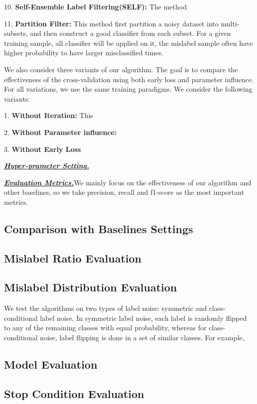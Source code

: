 10. \textbf{Self-Ensemble Label Filtering(SELF):} The method 

11. \textbf{Partition Filter:} This method first partition a noisy dataset into multi-subsets, and then construct a good classifier from each subset. For a given training sample, all classifier will be applied on it, the mislabel sample often have higher probability to have larger misclassified times.

We also consider three variants of our algorithm. The goal is to compare the effectiveness of the cross-validation using both early loss and parameter influence. For all variations, we use the same training paradigms. We consider the following variants:

1. \textbf{Without Iteration: } This  

2. \textbf{Without Parameter influence:} 

3. \textbf{Without Early Loss}

\textbf{\textit{\underline{Hyper-prameter Setting.}}} 

\textbf{\textit{\underline{Evaluation Metrics.}}}We mainly focus on the effectiveness of our algorithm and other baselines, so we take precision, recall and f1-score as the most important metrics.

\subsection{Comparison with Baselines Settings}

\subsection{Mislabel Ratio Evaluation}

\subsection{Mislabel Distribution Evaluation}

We test the algorithms on two types of label noise: symmetric and class-conditional label noise. In symmetric label noise, each label is randomly flipped to any of the remaining classes with equal probability, whereas for class-conditional noise, label flipping is done in a set of similar classes. For example, 

\subsection{Model Evaluation}

\subsection{Stop Condition Evaluation}
